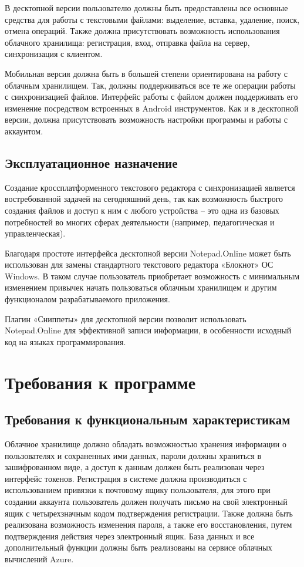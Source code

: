 В десктопной версии пользователю должны быть предоставлены все основные средства для работы с текстовыми файлами: выделение, вставка, удаление, поиск, отмена операций. Также должна присутствовать возможность использования облачного хранилища: регистрация, вход, отправка файла на сервер, синхронизация с клиентом.

Мобильная версия должна быть в большей степени ориентирована на работу с облачным хранилищем. Так, должны поддерживаться все те же операции работы с синхронизацией файлов. Интерфейс работы с файлом должен поддерживать его изменение посредством встроенных в Android инструментов. Как и в десктопной версии, должна присутствовать возможность настройки программы и работы с аккаунтом.

\subsection{Эксплуатационное назначение}
Создание кроссплатформенного текстового редактора с синхронизацией является востребованной задачей на сегодняшний день, так как возможность быстрого создания файлов и доступ к ним с любого устройства – это одна из базовых потребностей во многих сферах деятельности (например, педагогическая и управленческая).

Благодаря простоте интерфейса десктопной версии Notepad.Online может быть использован для замены стандартного текстового редактора «Блокнот» ОС Windows. В таком случае пользователь приобретает возможность с минимальным изменением привычек начать пользоваться облачным хранилищем и другим функционалом разрабатываемого приложения.

Плагин «Сниппеты» для десктопной версии позволит использовать Notepad.Online для эффективной записи информации, в особенности исходный код на языках программирования.

\section{Требования к программе}

\subsection{Требования к функциональным характеристикам}
Облачное хранилище должно обладать возможностью хранения информации о пользователях и сохраненных ими данных, пароли должны храниться в зашифрованном виде, а доступ к данным должен быть реализован через интерфейс токенов. Регистрация в системе должна производиться с использованием привязки к почтовому ящику пользователя, для этого при создании аккаунта пользователь должен получать письмо на свой электронный ящик с четырехзначным кодом подтверждения регистрации. Также должна быть реализована возможность изменения пароля, а также его восстановления, путем подтверждения действия через электронный ящик. База данных и все дополнительный функции должны быть реализованы на сервисе облачных вычислений Azure.

